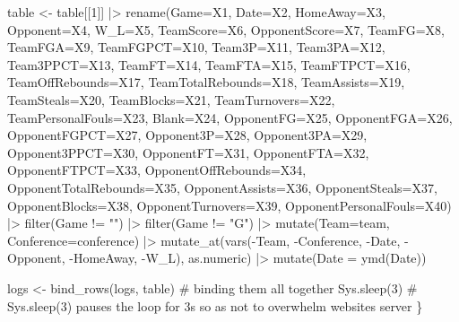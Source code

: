 \documentclass[
  letterpaper,
  DIV=11,
  numbers=noendperiod]{scrreprt}
\newenvironment{Shaded}{\begin{snugshade}}{\end{snugshade}}
\newcommand{\AttributeTok}[1]{\textcolor[rgb]{0.40,0.45,0.13}{#1}}
\newcommand{\CommentTok}[1]{\textcolor[rgb]{0.37,0.37,0.37}{#1}}
\newcommand{\DecValTok}[1]{\textcolor[rgb]{0.68,0.00,0.00}{#1}}
\newcommand{\FunctionTok}[1]{\textcolor[rgb]{0.28,0.35,0.67}{#1}}
\newcommand{\NormalTok}[1]{\textcolor[rgb]{0.00,0.23,0.31}{#1}}
\newcommand{\OtherTok}[1]{\textcolor[rgb]{0.00,0.23,0.31}{#1}}
\newcommand{\SpecialCharTok}[1]{\textcolor[rgb]{0.37,0.37,0.37}{#1}}
\newcommand{\StringTok}[1]{\textcolor[rgb]{0.13,0.47,0.30}{#1}}
\begin{document}
\begin{Shaded}
\begin{Highlighting}[]
\NormalTok{table }\OtherTok{\textless{}{-}}\NormalTok{ table[[}\DecValTok{1}\NormalTok{]] }\SpecialCharTok{|\textgreater{}} \FunctionTok{rename}\NormalTok{(}\AttributeTok{Game=}\NormalTok{X1, }\AttributeTok{Date=}\NormalTok{X2, }\AttributeTok{HomeAway=}\NormalTok{X3, }\AttributeTok{Opponent=}\NormalTok{X4, }\AttributeTok{W\_L=}\NormalTok{X5, }\AttributeTok{TeamScore=}\NormalTok{X6, }\AttributeTok{OpponentScore=}\NormalTok{X7, }\AttributeTok{TeamFG=}\NormalTok{X8, }\AttributeTok{TeamFGA=}\NormalTok{X9, }\AttributeTok{TeamFGPCT=}\NormalTok{X10, }\AttributeTok{Team3P=}\NormalTok{X11, }\AttributeTok{Team3PA=}\NormalTok{X12, }\AttributeTok{Team3PPCT=}\NormalTok{X13, }\AttributeTok{TeamFT=}\NormalTok{X14, }\AttributeTok{TeamFTA=}\NormalTok{X15, }\AttributeTok{TeamFTPCT=}\NormalTok{X16, }\AttributeTok{TeamOffRebounds=}\NormalTok{X17, }\AttributeTok{TeamTotalRebounds=}\NormalTok{X18, }\AttributeTok{TeamAssists=}\NormalTok{X19, }\AttributeTok{TeamSteals=}\NormalTok{X20, }\AttributeTok{TeamBlocks=}\NormalTok{X21, }\AttributeTok{TeamTurnovers=}\NormalTok{X22, }\AttributeTok{TeamPersonalFouls=}\NormalTok{X23, }\AttributeTok{Blank=}\NormalTok{X24, }\AttributeTok{OpponentFG=}\NormalTok{X25, }\AttributeTok{OpponentFGA=}\NormalTok{X26, }\AttributeTok{OpponentFGPCT=}\NormalTok{X27, }\AttributeTok{Opponent3P=}\NormalTok{X28, }\AttributeTok{Opponent3PA=}\NormalTok{X29, }\AttributeTok{Opponent3PPCT=}\NormalTok{X30, }\AttributeTok{OpponentFT=}\NormalTok{X31, }\AttributeTok{OpponentFTA=}\NormalTok{X32, }\AttributeTok{OpponentFTPCT=}\NormalTok{X33, }\AttributeTok{OpponentOffRebounds=}\NormalTok{X34, }\AttributeTok{OpponentTotalRebounds=}\NormalTok{X35, }\AttributeTok{OpponentAssists=}\NormalTok{X36, }\AttributeTok{OpponentSteals=}\NormalTok{X37, }\AttributeTok{OpponentBlocks=}\NormalTok{X38, }\AttributeTok{OpponentTurnovers=}\NormalTok{X39, }\AttributeTok{OpponentPersonalFouls=}\NormalTok{X40) }\SpecialCharTok{|\textgreater{}} \FunctionTok{filter}\NormalTok{(Game }\SpecialCharTok{!=} \StringTok{""}\NormalTok{) }\SpecialCharTok{|\textgreater{}} \FunctionTok{filter}\NormalTok{(Game }\SpecialCharTok{!=} \StringTok{"G"}\NormalTok{) }\SpecialCharTok{|\textgreater{}} \FunctionTok{mutate}\NormalTok{(}\AttributeTok{Team=}\NormalTok{team, }\AttributeTok{Conference=}\NormalTok{conference) }\SpecialCharTok{|\textgreater{}} \FunctionTok{mutate\_at}\NormalTok{(}\FunctionTok{vars}\NormalTok{(}\SpecialCharTok{{-}}\NormalTok{Team, }\SpecialCharTok{{-}}\NormalTok{Conference, }\SpecialCharTok{{-}}\NormalTok{Date, }\SpecialCharTok{{-}}\NormalTok{Opponent, }\SpecialCharTok{{-}}\NormalTok{HomeAway, }\SpecialCharTok{{-}}\NormalTok{W\_L), as.numeric) }\SpecialCharTok{|\textgreater{}} \FunctionTok{mutate}\NormalTok{(}\AttributeTok{Date =} \FunctionTok{ymd}\NormalTok{(Date))}

\NormalTok{  logs }\OtherTok{\textless{}{-}} \FunctionTok{bind\_rows}\NormalTok{(logs, table)  }\CommentTok{\# binding them all together}
  \FunctionTok{Sys.sleep}\NormalTok{(}\DecValTok{3}\NormalTok{)  }\CommentTok{\# Sys.sleep(3) pauses the loop for 3s so as not to overwhelm website\textquotesingle{}s server}
\NormalTok{\}}
\end{Highlighting}
\end{Shaded}
\end{document}
